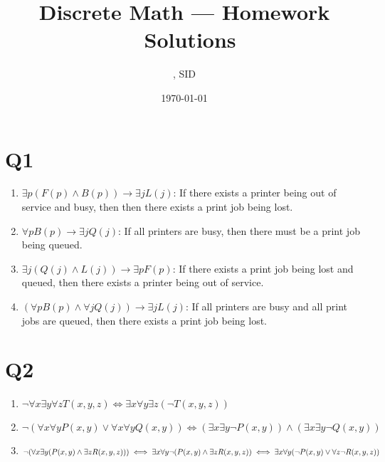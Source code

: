 \documentclass[11pt]{article}
\title{Discrete Math --- Homework \Homework \ Solutions}
\author{\Name, SID \SID}
\date{\today}
\newenvironment{qparts}{\begin{enumerate}[{(}a{)}]}{\end{enumerate}}
\begin{document}
\maketitle

\section*{Q1}
\begin{qparts}
    
    \item $\exists p(F(p)\land B(p)) \to \exists jL(j)$: 
    If there exists a printer being out of service and busy, then 
    then there exists a print job being lost.

    \item $\forall pB(p) \to \exists jQ(j)$: 
    If all printers are busy, then there must be 
    a print job being queued.
    
    \item $\exists j(Q(j)\land L(j))\to \exists pF(p)$: 
    If there exists a print job being lost and queued, then there exists
    a printer being out of service.
    
    \item $(\forall pB(p) \land \forall jQ(j)) \to \exists jL(j)$:
    If all printers are busy and all print jobs are queued, then
    there exists a print job being lost.
\end{qparts}



\section*{Q2}
\begin{qparts}
    
    \item $\lnot \forall x \exists y \forall zT(x,y,z)
    \iff\exists x \forall y \exists z (\lnot T(x,y,z))$

    
    \item $\lnot (\forall x\forall yP(x,y)\lor \forall x\forall yQ(x,y))
    \iff (\exists x\exists y\lnot P(x,y)) \land (\exists x \exists y \lnot Q(x,y))$
    
    \item $\lnot (\forall x \exists y (P(x,y)\land \exists zR(x,y,z))
    )\iff\exists x \forall y \lnot (P(x,y)\land \exists zR(x,y,z))\\
    \iff\exists x \forall y (\lnot P(x,y) \lor \forall z \lnot R(x,y,z))$
\end{qparts}
\end{document}

